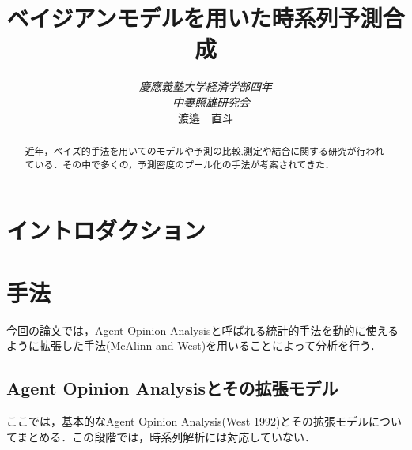 \documentclass[11pt,a4paper]{article}
\title{ベイジアンモデルを用いた時系列予測合成}
\author{\emph{慶應義塾大学経済学部四年}\\　\emph{中妻照雄研究会} \\渡邉　直斗  }
\date{}
\begin{document}
\maketitle

\begin{abstract}
近年，ベイズ的手法を用いてのモデルや予測の比較,測定や結合に関する研究が行われている．その中で多くの，予測密度のプール化の手法が考案されてきた．
\end{abstract}

\clearpage
\setcounter{tocdepth}{3}
\tableofcontents
\clearpage
\newtheorem{theo}{定理}[section]
\newtheorem{defi}[theo]{定義}
\newtheorem{lemm}[theo]{補題}
\newtheorem{Proof}{証明}

\section{イントロダクション}


\section{手法}
今回の論文では，Agent Opinion Analysisと呼ばれる統計的手法を動的に使えるように拡張した手法(McAlinn and West)を用いることによって分析を行う．
\subsection{Agent Opinion Analysisとその拡張モデル}
ここでは，基本的なAgent Opinion Analysis(West 1992)とその拡張モデルについてまとめる．この段階では，時系列解析には対応していない．\par
\end{document}
